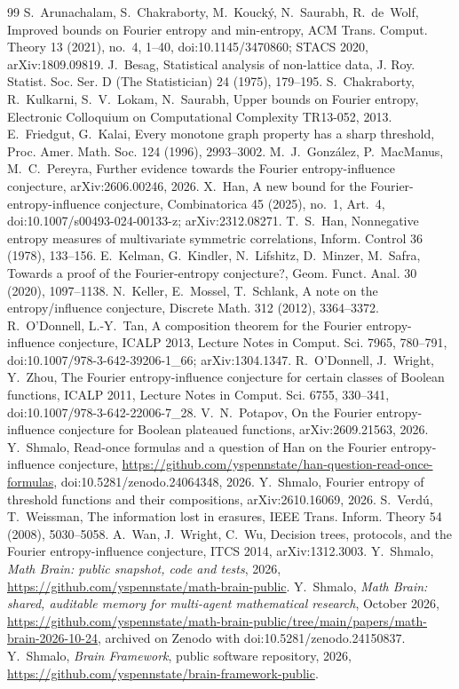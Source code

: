 \documentclass[11pt]{amsart}
\theoremstyle{remark}
\begin{document}
\begin{thebibliography}{99}
 S.~Arunachalam, S.~Chakraborty, M.~Kouck\'y, N.~Saurabh, R.~de~Wolf, Improved bounds on Fourier
entropy and min-entropy, ACM Trans. Comput. Theory 13 (2021), no.~4, 1--40, doi:10.1145/3470860; STACS 2020, arXiv:1809.09819.
 J.~Besag, Statistical analysis of non-lattice data, J. Roy. Statist. Soc. Ser. D (The Statistician)
24 (1975), 179--195.
 S.~Chakraborty, R.~Kulkarni, S.~V.~Lokam, N.~Saurabh, Upper bounds on Fourier entropy,
Electronic Colloquium on Computational Complexity TR13-052, 2013.
 E.~Friedgut, G.~Kalai, Every monotone graph property has a sharp threshold, Proc. Amer. Math. Soc.
124 (1996), 2993--3002.
 M.~J.~Gonz\'alez, P.~MacManus, M.~C.~Pereyra, Further evidence towards the Fourier
entropy-influence conjecture, arXiv:2606.00246, 2026.
 X.~Han, A new bound for the Fourier-entropy-influence conjecture, Combinatorica 45 (2025), no.~1,
Art.~4, doi:10.1007/s00493-024-00133-z; arXiv:2312.08271.
 T.~S.~Han, Nonnegative entropy measures of multivariate symmetric correlations, Inform. Control 36
(1978), 133--156.
 E.~Kelman, G.~Kindler, N.~Lifshitz, D.~Minzer, M.~Safra, Towards a proof of the
Fourier-entropy conjecture?, Geom. Funct. Anal. 30 (2020), 1097--1138.
 N.~Keller, E.~Mossel, T.~Schlank, A note on the entropy/influence conjecture, Discrete Math. 312
(2012), 3364--3372.
 R.~O'Donnell, L.-Y.~Tan, A composition theorem for the Fourier entropy-influence conjecture,
ICALP 2013, Lecture Notes in Comput. Sci. 7965, 780--791, doi:10.1007/978-3-642-39206-1\_66; arXiv:1304.1347.
 R.~O'Donnell, J.~Wright, Y.~Zhou, The Fourier entropy-influence conjecture for certain classes of
Boolean functions, ICALP 2011, Lecture Notes in Comput. Sci. 6755, 330--341, doi:10.1007/978-3-642-22006-7\_28.
 V.~N.~Potapov, On the Fourier entropy-influence conjecture for Boolean plateaued functions,
arXiv:2609.21563, 2026.
 Y.~Shmalo, Read-once formulas and a question of Han on the Fourier entropy-influence conjecture,
\url{https://github.com/yspennstate/han-question-read-once-formulas}, doi:10.5281/zenodo.24064348, 2026.
 Y.~Shmalo, Fourier entropy of threshold functions and their compositions,
arXiv:2610.16069, 2026.
 S.~Verd\'u, T.~Weissman, The information lost in erasures, IEEE Trans. Inform. Theory 54 (2008),
5030--5058.
 A.~Wan, J.~Wright, C.~Wu, Decision trees, protocols, and the Fourier entropy-influence conjecture,
ITCS 2014, arXiv:1312.3003.
 Y.~Shmalo, \emph{Math Brain: public snapshot, code and tests}, 2026,
\url{https://github.com/yspennstate/math-brain-public}.
 Y.~Shmalo, \emph{Math Brain: shared, auditable memory for multi-agent mathematical research},
October 2026, \url{https://github.com/yspennstate/math-brain-public/tree/main/papers/math-brain-2026-10-24}, archived on Zenodo with doi:10.5281/zenodo.24150837.
 Y.~Shmalo, \emph{Brain Framework}, public software repository, 2026,
\url{https://github.com/yspennstate/brain-framework-public}.
\end{thebibliography}
\end{document}
